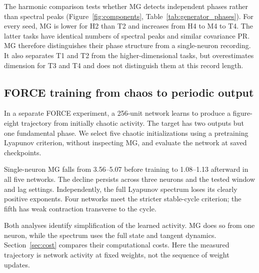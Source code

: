 {The harmonic comparison tests whether MG detects independent phases rather than spectral peaks (Figure~\ref{fig:components}, Table~\ref{tab:generator_phases}). For every seed, MG is lower for H2 than T2 and increases from H4 to M4 to T4. The latter tasks have identical numbers of spectral peaks and similar covariance PR. MG therefore distinguishes their phase structure from a single-neuron recording. It also separates T1 and T2 from the higher-dimensional tasks, but overestimates dimension for T3 and T4 and does not distinguish them at this record length.

\begin{table}[t]
\centering\small
\caption{}
\label{tab:generator_phases}

\end{table}

\subsection{FORCE training from chaos to periodic output}\label{sec:force}
In a separate FORCE experiment, a 256-unit network learns to produce a figure-eight trajectory from initially chaotic activity. The target has two outputs but one fundamental phase. We select five chaotic initializations using a pretraining Lyapunov criterion, without inspecting MG, and evaluate the network at saved checkpoints.

Single-neuron MG falls from 3.56--5.07 before training to 1.08--1.13 afterward in all five networks. The decline persists across three neurons and the tested window and lag settings. Independently, the full Lyapunov spectrum loses its clearly positive exponents. Four networks meet the stricter stable-cycle criterion; the fifth has weak contraction transverse to the cycle.

Both analyses identify simplification of the learned activity. MG does so from one neuron, while the spectrum uses the full state and tangent dynamics. Section~\ref{sec:cost} compares their computational costs. Here the measured trajectory is network activity at fixed weights, not the sequence of weight updates.
}
